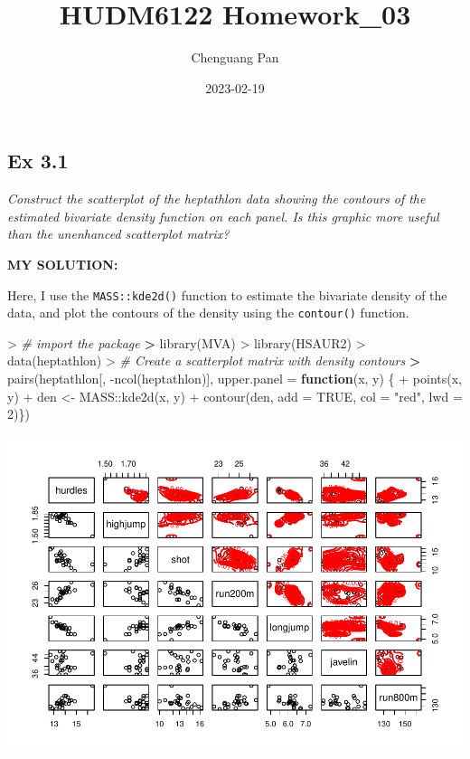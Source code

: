 \documentclass[
]{article}
\title{HUDM6122 Homework\_03}
\author{Chenguang Pan}
\date{2023-02-19}
\newenvironment{Shaded}{\begin{snugshade}}{\end{snugshade}}
\newcommand{\AttributeTok}[1]{\textcolor[rgb]{0.77,0.63,0.00}{#1}}
\newcommand{\CommentTok}[1]{\textcolor[rgb]{0.56,0.35,0.01}{\textit{#1}}}
\newcommand{\ConstantTok}[1]{\textcolor[rgb]{0.00,0.00,0.00}{#1}}
\newcommand{\ControlFlowTok}[1]{\textcolor[rgb]{0.13,0.29,0.53}{\textbf{#1}}}
\newcommand{\DecValTok}[1]{\textcolor[rgb]{0.00,0.00,0.81}{#1}}
\newcommand{\ErrorTok}[1]{\textcolor[rgb]{0.64,0.00,0.00}{\textbf{#1}}}
\newcommand{\FunctionTok}[1]{\textcolor[rgb]{0.00,0.00,0.00}{#1}}
\newcommand{\NormalTok}[1]{#1}
\newcommand{\OtherTok}[1]{\textcolor[rgb]{0.56,0.35,0.01}{#1}}
\newcommand{\SpecialCharTok}[1]{\textcolor[rgb]{0.00,0.00,0.00}{#1}}
\newcommand{\StringTok}[1]{\textcolor[rgb]{0.31,0.60,0.02}{#1}}
\begin{document}
\maketitle

\hypertarget{ex-3.1}{%
\subsection{Ex 3.1}\label{ex-3.1}}

\emph{Construct the scatterplot of the heptathlon data showing the
contours of the estimated bivariate density function on each panel. Is
this graphic more useful than the unenhanced scatterplot matrix?}

\textbf{MY SOLUTION:}

Here, I use the \texttt{MASS::kde2d()} function to estimate the
bivariate density of the data, and plot the contours of the density
using the \texttt{contour()} function.

\begin{Shaded}
\begin{Highlighting}[]
\SpecialCharTok{\textgreater{}} \CommentTok{\# import the package}
\ErrorTok{\textgreater{}} \FunctionTok{library}\NormalTok{(MVA)}
\SpecialCharTok{\textgreater{}} \FunctionTok{library}\NormalTok{(HSAUR2)}
\SpecialCharTok{\textgreater{}} \FunctionTok{data}\NormalTok{(heptathlon)}
\SpecialCharTok{\textgreater{}} \CommentTok{\# Create a scatterplot matrix with density contours}
\ErrorTok{\textgreater{}} \FunctionTok{pairs}\NormalTok{(heptathlon[, }\SpecialCharTok{{-}}\FunctionTok{ncol}\NormalTok{(heptathlon)], }\AttributeTok{upper.panel =} \ControlFlowTok{function}\NormalTok{(x, y) \{}
\SpecialCharTok{+}   \FunctionTok{points}\NormalTok{(x, y)}
\SpecialCharTok{+}\NormalTok{   den }\OtherTok{\textless{}{-}}\NormalTok{ MASS}\SpecialCharTok{::}\FunctionTok{kde2d}\NormalTok{(x, y)}
\SpecialCharTok{+}   \FunctionTok{contour}\NormalTok{(den, }\AttributeTok{add =} \ConstantTok{TRUE}\NormalTok{, }\AttributeTok{col =} \StringTok{"red"}\NormalTok{, }\AttributeTok{lwd =} \DecValTok{2}\NormalTok{)\})}
\end{Highlighting}
\end{Shaded}

\includegraphics{HUDM6122-Homework_03-Chenguang-Pan_files/figure-latex/unnamed-chunk-1-1.pdf}
\end{document}
